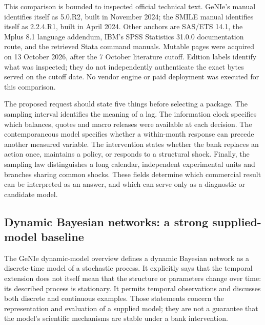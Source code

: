 This comparison is bounded to inspected official technical text. GeNIe's
manual identifies itself as 5.0.R2, built in November 2024; the SMILE
manual identifies itself as 2.2.4.R1, built in April 2024. Other anchors
are SAS/ETS 14.1, the Mplus 8.1 language addendum, IBM's SPSS Statistics
31.0.0 documentation route, and the retrieved Stata command manuals.
Mutable pages were acquired on 13 October 2026, after the 7 October
literature cutoff. Edition labels identify what was inspected; they do
not independently authenticate the exact bytes served on the cutoff
date. No vendor engine or paid deployment was executed for this
comparison.
\citep{exec13_genie_readme,exec13_smile_intro,exec13_ct_genie_learning,
exec13_ct_sas_causal,exec13_ct_mplus81,exec13_ct_ibm_tcm,exec13_ct_stata_granger}

The proposed request should state five things before selecting a
package. The sampling interval identifies the meaning of a lag. The
information clock specifies which balances, quotes and macro releases
were available at each decision. The contemporaneous model specifies
whether a within-month response can precede another measured variable.
The intervention states whether the bank replaces an action once,
maintains a policy, or responds to a structural shock. Finally, the
sampling law distinguishes a long calendar, independent experimental
units and branches sharing common shocks. These fields determine which
commercial result can be interpreted as an answer, and which can serve
only as a diagnostic or candidate model.

\hypertarget{dynamic-bayesian-networks-a-strong-supplied-model-baseline}{%
\subsection{Dynamic Bayesian networks: a strong supplied-model
baseline}\label{dynamic-bayesian-networks-a-strong-supplied-model-baseline}}

The GeNIe dynamic-model overview defines a dynamic Bayesian network as a
discrete-time model of a stochastic process. It explicitly says that the
temporal extension does not itself mean that the structure or parameters
change over time: its described process is stationary. It permits
temporal observations and discusses both discrete and continuous
examples. Those statements concern the representation and evaluation of
a supplied model; they are not a guarantee that the model's scientific
mechanisms are stable under a bank
intervention.~\citep{exec13_ct_genie_dbn}

